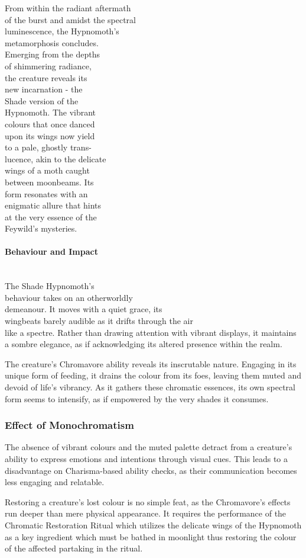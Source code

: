 From within the radiant aftermath\\of the burst and amidst the spectral\\luminescence, the Hypnomoth's\\metamorphosis concludes.\\Emerging from the depths\\of shimmering radiance,\\the creature reveals its\\new incarnation - the\\Shade version of the\\Hypnomoth. The vibrant\\colours that once danced\\upon its wings now yield\\to a pale, ghostly trans-\\lucence, akin to the delicate\\wings of a moth caught\\between moonbeams. Its\\form resonates with an\\enigmatic allure that hints\\at the very essence of the\\Feywild's mysteries.\\
\paragraph*{Behaviour and Impact}\hfill\\
The Shade Hypnomoth's\\behaviour takes on an otherworldly\\demeanour. It moves with a quiet grace, its\\wingbeats barely audible as it drifts through the air\\like a spectre. Rather than drawing attention with vibrant displays, it maintains a sombre elegance, as if acknowledging its altered presence within the realm.

The creature's Chromavore ability reveals its inscrutable nature. Engaging in its unique form of feeding, it drains the colour from its foes, leaving them muted and devoid of life's vibrancy. As it gathers these chromatic essences, its own spectral form seems to intensify, as if empowered by the very shades it consumes.
\subsubsection*{Effect of Monochromatism}\label{sec:Monochromatism}
The absence of vibrant colours and the muted palette detract from a creature's ability to express emotions and intentions through visual cues. This leads to a disadvantage on Charisma-based ability checks, as their communication becomes less engaging and relatable.

Restoring a creature's lost colour is no simple feat, as the Chromavore's effects run deeper than mere physical appearance. It requires the performance of the Chromatic Restoration Ritual which utilizes the delicate wings of the Hypnomoth as a key ingredient which must be bathed in moonlight thus restoring the colour of the affected partaking in the ritual.